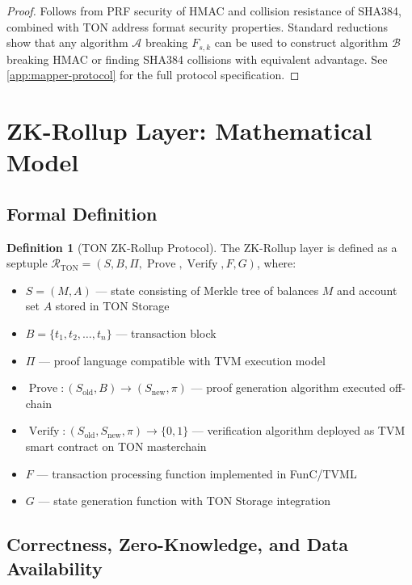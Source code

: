 \documentclass[12pt,a4paper]{article}
\theoremstyle{definition}
\newtheorem{definition}{Definition}[section]
\theoremstyle{remark}
\DeclareMathOperator{\Verify}{Verify}
\DeclareMathOperator{\Prove}{Prove}
\begin{document}
\begin{proof}
Follows from PRF security of HMAC and collision resistance of SHA384, combined with TON address format security properties. Standard reductions show that any algorithm $\mathcal{A}$ breaking $F_{s,k}$ can be used to construct algorithm $\mathcal{B}$ breaking HMAC or finding SHA384 collisions with equivalent advantage. See \cref{app:mapper-protocol} for the full protocol specification.
\end{proof}


\section{ZK-Rollup Layer: Mathematical Model}
\label{sec:zk-rollup-formal}

\subsection{Formal Definition}

\begin{definition}[TON ZK-Rollup Protocol]
The ZK-Rollup layer is defined as a septuple $\mathcal{R}_{\text{TON}} = (S, B, \Pi, \Prove, \Verify, F, G)$, where:
\begin{itemize}[nosep]
    \item $S = (M, A)$ --- state consisting of Merkle tree of balances $M$ and account set $A$ stored in TON Storage
    \item $B = \{t_1, t_2, \ldots, t_n\}$ --- transaction block
    \item $\Pi$ --- proof language compatible with TVM execution model
    \item $\Prove: (S_{\text{old}}, B) \to (S_{\text{new}}, \pi)$ --- proof generation algorithm executed off-chain
    \item $\Verify: (S_{\text{old}}, S_{\text{new}}, \pi) \to \{0,1\}$ --- verification algorithm deployed as TVM smart contract on TON masterchain
    \item $F$ --- transaction processing function implemented in FunC/TVML
    \item $G$ --- state generation function with TON Storage integration
\end{itemize}
\end{definition}

\subsection{Correctness, Zero-Knowledge, and Data Availability}
\end{document}
